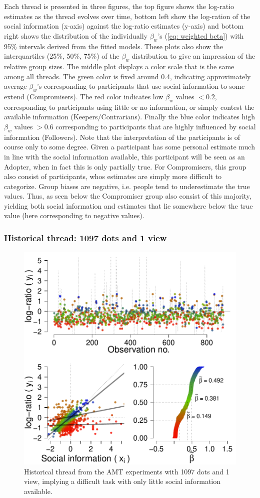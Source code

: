 \documentclass[10pt,a4paper,twocolumn,lineno]{article}
\begin{document}
Each thread is presented in three figures, the top figure shows the log-ratio estimates as the thread evolves over time, bottom left show the log-ration of the social information (x-axis) against the log-ratio estimates (y-axis) and bottom right shows the distribution of the individually $\beta_w$'s (\ref{eq: weighted beta}) with 95\% intervals derived from the fitted models. These plots also show the interquartiles (25\%, 50\%, 75\%) of the $\beta_w$ distribution to give an impression of the relative group sizes. The middle plot displays a color scale that is the same among all threads. The green color is fixed around 0.4, indicating approximately average $\beta_w$'s  corresponding to participants that use social information to some extend (Compromisers). The red color indicates low $\beta_w$ values $<0.2$, corresponding to participants using little or no information, or simply contest the available information (Keepers/Contrarians). Finally the blue color indicates high $\beta_w$ values $>0.6$ corresponding to participants that are highly influenced by social information (Followers). Note that the interpretation of the participants is of course only to some degree. Given a participant has some personal estimate much in line with the social information available, this participant will be seen as an Adopter, when in fact this is only partially true. For Compromisers, this group also consist of participants, whos estimates are simply more difficult to categorize. Group biases are negative, i.e. people tend to underestimate the true values. Thus, as seen below the Compromiser group also consist of this majority, yielding both social information and estimates that lie somewhere below the true value (here corresponding to negative values).

\subsubsection{Historical thread: 1097 dots and 1 view}
\begin{figure}[htbp]
	\centering\includegraphics[width=.5\textwidth]{../plots/h10971.pdf}
	\caption{Historical thread from the AMT experiments with 1097 dots and 1 view, implying a difficult task with only little social information available.}\label{fig: thread h 1097 1}
\end{figure}
\end{document}
